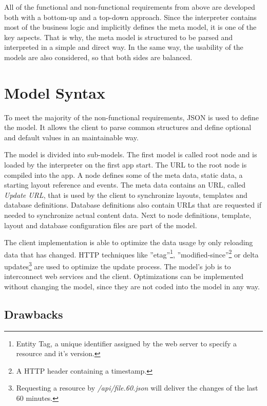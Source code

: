 All of the functional and non-functional requirements from above are developed both with a bottom-up and a top-down approach.
Since the interpreter contains most of the business logic and implicitly defines the meta model, it is one of the key aspects.
That is why, the meta model is structured to be parsed and interpreted in a simple and direct way.
In the same way, the usability of the models are also considered, so that both sides are balanced.


\section{Model Syntax}
\label{sec:modelsyntax}

To meet the majority of the non-functional requirements, \ac{JSON} is used to define the model.
It allows the client to parse common structures and define optional and default values in an maintainable way.

The model is divided into sub-models.
The first model is called root node and is loaded by the interpreter on the first app start.
The \ac{URL} to the root node is compiled into the app.
A node defines some of the meta data, static data, a starting layout reference and events.
The meta data contains an \ac{URL}, called \textit{Update URL}, that is used by the client to synchronize layouts, templates and database definitions.
Database definitions also contain \acp{URL} that are requested if needed to synchronize actual content data.
Next to node definitions, template, layout and database configuration files are part of the model.

The client implementation is able to optimize the data usage by only reloading data that has changed.
\ac{HTTP} techniques like ''etag''\footnote{Entity Tag, a unique identifier assigned by the web server to specify a resource and it's version.}, ''modified-since''\footnote{A \ac{HTTP} header containing a timestamp.} or delta updates\footnote{Requesting a resource by \textit{/api/file.60.json} will deliver the changes of the last 60 minutes.} are used to optimize the update process.
The model's job is to interconnect web services and the client.
Optimizations can be implemented without changing the model, since they are not coded into the model in any way.




\subsection{Drawbacks}

